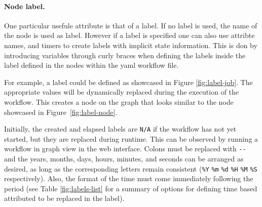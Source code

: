 \begin{table}[htb]
\caption{Node attributes}
\end{table}

\paragraph{Node label.}
One particular usefule attribute is that of a label. If no label is
used, the name of the node is used as label. However if a label is
specified one can also use attribte names, and timers to create labels
with implicit state information. This is don by introducing variables
through curly braces when defining the labels inside the label defined
in the nodes within the yaml workflow file.

For example, a label could be defined as showcased in
Figure \ref{fig:label-job}. The appropriate values will be dynamically
replaced during the execution of the workflow.
This creates a node on the graph that looks similar to the node
showcased in Figure~\ref{fig:label-node}.

Initially, the created and elapsed labels are \texttt{N/A} if the
workflow has not yet started, but they are replaced during runtime. This
can be observed by running a workflow in graph view in the web
interface. Colons must be replaced with \texttt{-\/-} and the years, months, days,
hours, minutes, and seconds can be arranged as desired, as long as the
corresponding letters remain consistent (\texttt{\%Y} \texttt{\%m}
\texttt{\%d} \texttt{\%H} \texttt{\%M} \texttt{\%S} respectively). Also,
the format of the time must come immediately following the period (see
Table \ref{fig:labels-list} for a summary of options for defining time
based attributed to be replaced in the label).

